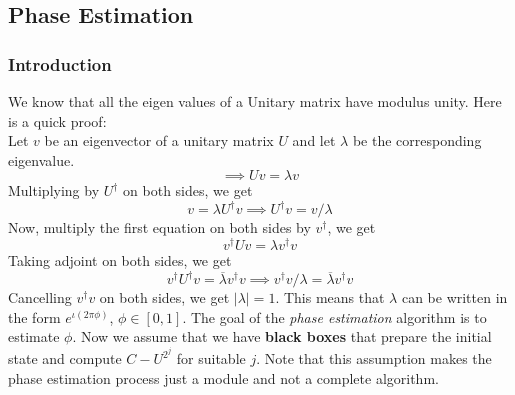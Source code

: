 \documentclass{article}
\begin{document}
\subsection{Phase Estimation}
\subsubsection{Introduction}
We know that all the eigen values of a Unitary matrix have modulus unity. Here is a quick proof:\\
Let $v$ be an eigenvector of a unitary matrix $U$ and let $\lambda$ be the corresponding eigenvalue. $$\implies Uv = \lambda v$$ Multiplying by $U^{\dagger}$ on both sides, we get $$v = \lambda U^{\dagger}v \implies U^{\dagger}v = v/\lambda $$ Now, multiply the first equation on both sides by $v^{\dagger}$, we get
$$v^{\dagger}Uv = \lambda v^{\dagger}v$$ Taking adjoint on both sides, we get $$v^{\dagger}U^{\dagger}v = \overline{\lambda} v^{\dagger}v \implies v^{\dagger}v/\lambda = \overline{\lambda} v^{\dagger}v$$
Cancelling $v^{\dagger}v$ on both sides, we get $|\lambda| = 1$. This means that $\lambda$ can be written in the form $e^{\iota(2\pi \phi)}$, $\phi \in [0, 1]$. The goal of the \textit{phase estimation} algorithm is to estimate $\phi$. Now we assume that we have \textbf{black boxes} that prepare the initial state and compute $C-U^{2^j}$ for suitable $j$. Note that this assumption makes the phase estimation process just a module and not a complete algorithm. 
\end{document}

